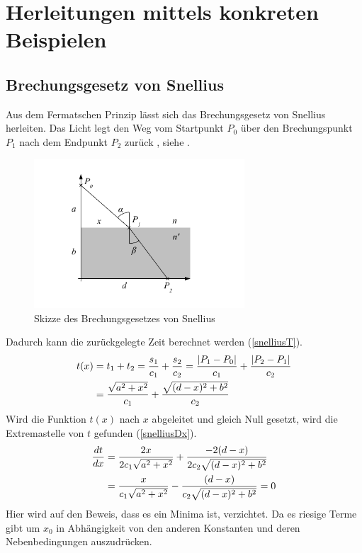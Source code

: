 \section{Herleitungen mittels konkreten Beispielen}
\subsection{Brechungsgesetz von Snellius \label{brechungsgesetz}}
Aus dem Fermatschen Prinzip lässt sich das Brechungsgesetz von Snellius herleiten.
Das Licht legt den Weg vom Startpunkt $P_0$ über den Brechungspunkt $P_1$ 
nach dem Endpunkt $P_2$ zurück \cite{Wikipedia}, siehe  .
\begin{figure}[h]
\begin{center}
	\includegraphics[width=0.7\textwidth]{./picture/Brechung.pdf}
	\caption{Skizze des Brechungsgesetzes von Snellius}
	\label{Ab:brechung}
\end{center}
\end{figure}
Dadurch kann die zurückgelegte Zeit berechnet werden (\eqref{snelliusT}).
\begin{align}
t(x) &= t_1 + t_2 = \frac{s_1}{c_1} + \frac{s_2}{c_2} = \frac{|P_1 - P_0|}{c_1} + \frac{|P_2 - P_1|}{c_2} \notag \\
&= \frac{\sqrt{a^2 + x^2}}{c_1} + \frac{\sqrt{(d-x)^2 + b^2}}{c_2} \label{snelliusT}
\end{align}
Wird die Funktion $t(x)$ nach $x$ abgeleitet und gleich Null gesetzt, wird die Extremastelle von $t$ gefunden (\eqref{snelliusDx}).
\begin{align}
	\frac{dt}{dx} &= \frac{2 x}{2  c_1  \sqrt{a^2 + x^2}} + \frac{-2  (d-x)}{2  c_2  \sqrt{(d-x)^2 + b^2}} \notag \\
	&= \frac{x}{c_1 \sqrt{a^2 + x^2}} - \frac{(d-x)}{c_2  \sqrt{(d-x)^2 + b^2}} = 0 
	\label{snelliusDx}
\end{align}
Hier wird auf den Beweis, dass es ein Minima ist, verzichtet. Da es riesige Terme gibt um $x_0$ in Abhängigkeit von den anderen Konstanten und deren Nebenbedingungen auszudrücken.
